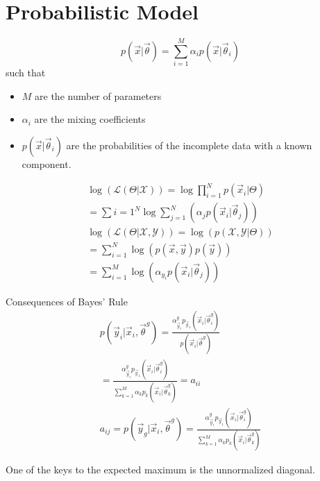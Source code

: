 \section{Probabilistic Model}
\begin{equation}
p( \vec{x} | \vec{\theta}) = \sum_{i=1} ^M \alpha_i p( \vec{x} |\vec{\theta}_i)
\end{equation}
such that 
\begin{itemize}
\item $M$ are the number of parameters
\item $\alpha_i$ are the mixing coefficients
\item $p(\vec{x} | \vec{\theta}_i)$ are the probabilities of the incomplete data with a known component. 
\end{itemize}

\begin{eqnarray}
\log (\mathcal{L} ( \Theta | \mathcal{X})) = \log \prod_{i=1}^N p( \vec{x}_i | \Theta) \\
= \sum{i=1}^N \log  \sum_{j=1}^N (\alpha _j p( \vec{x}_i | \vec{\theta}_j) ) \\
\log ( \mathcal{L}(\Theta | \mathcal{X} , \mathcal{Y})) = \log (p ( \mathcal{X}, \mathcal{Y} | \Theta)) \\
= \sum_{i=1}^N \log (p(\vec{x} , \vec{y}) p(\vec{y})) \\
=\sum_{i=1}^M \log ( \alpha_{y_i} p (\vec{x}_i | \vec{\theta}_j))
\end{eqnarray}

Consequences of Bayes' Rule
\begin{eqnarray}
p( \vec{y}_i | \vec{x}_i , \vec{\theta}^g) = \frac {\alpha^g _{\vec{y}_i} p_{\vec{y}_1} ( \vec{x}_i | \vec{\theta}_i ^g) }{ p (\vec{x}_i| \vec{\theta}^g ) } \\
= \frac {\alpha^g _{\vec{y}_i} p_{\vec{y}_1} ( \vec{x}_i | \vec{\theta}_i ^g) }{ \sum_{k=1}^M \alpha_k p_k (\vec{x}_i| \vec{\theta}^g _k ) }
= a_{ii} \\
a_{ij} = p( \vec{y}_g | \vec{x}_i , \vec{\theta}^g)
 = \frac {\alpha^g _{\vec{y}_i} p_{\vec{y}_1} ( \vec{x}_i | \vec{\theta}_i ^g) }{ \sum_{k=1}^M \alpha_k p_k (\vec{x}_i| \vec{\theta}^g _k ) }
\end{eqnarray}


One of the keys to the expected maximum is the unnormalized diagonal.  

